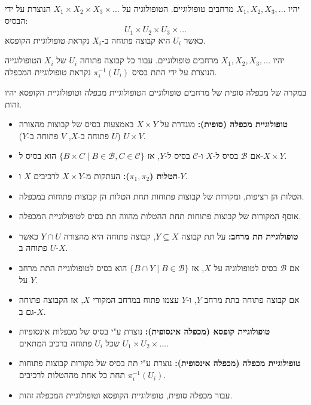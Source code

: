 \documentclass{tstextbook}
\begin{document}
\begin{definition}
יהיו \(X_{1},X_{2},X_{3},\dots\) מרחבים טופולוגיים. הטופולוגיה על \(X_{1}\times X_{2}\times X_{3}\times\dots\) הנוצרת על ידי הבסיס:
$$U_{1}\times U_{2}\times U_{3}\times\dots$$
כאשר \(U_{i}\) היא קבוצה פתוחה ב-\(X_{i}\) נקראת טופולוגיית הקופסא.

\end{definition}
\begin{definition}
יהיו \(X_{1},X_{2},X_{3},\dots\) מרחבים טופולוגיים. עבור כל קבוצה פתוחה \(U_{i}\) של \(X_{i}\) הטופולוגייה הנוצרת על ידי התת בסיס \(\pi_{i}^{-1}(U_{i})\) נקראת טופולוגיית המכפלה.

\end{definition}
\begin{remark}
במקרה של מכפלה סופית של מרחבים טופולוגיים הטופולוגיית מכפלה וטופולוגיית הקופסא יהיו זהות.

\end{remark}
\begin{summary}
  \begin{itemize}
    \item \textbf{טופולוגיית מכפלה (סופית):} מוגדרת על \(X \times Y\) באמצעות בסיס של קבוצות מהצורה \(U \times V\) (\(U\) פתוחה ב-\(X\), \(V\) פתוחה ב-\(Y\)).
    \item אם \(\mathcal{B}\) בסיס ל-\(X\) ו-\(\mathcal{C}\) בסיס ל-\(Y\), אז \(\{B \times C \mid B \in \mathcal{B}, C \in \mathcal{C}\}\) הוא בסיס ל-\(X \times Y\).
    \item \textbf{הטלות (\(\pi_1, \pi_2\)):} העתקות מ-\(X \times Y\) לרכיבים \(X\) ו-\(Y\).
    \item הטלות הן רציפות, ומקורות של קבוצות פתוחות תחת הטלות הן קבוצות פתוחות במכפלה.
    \item אוסף המקורות של קבוצות פתוחות תחת ההטלות מהווה תת בסיס לטופולוגיית המכפלה.
    \item \textbf{טופולוגיית תת מרחב:} על תת קבוצה \(Y \subseteq X\), קבוצה פתוחה היא מהצורה \(Y \cap U\) כאשר \(U\) פתוחה ב-\(X\).
    \item אם \(\mathcal{B}\) בסיס לטופולוגיה על \(X\), אז \(\{B \cap Y \mid B \in \mathcal{B}\}\) הוא בסיס לטופולוגיית התת מרחב על \(Y\).
    \item אם קבוצה פתוחה בתת מרחב \(Y\), ו-\(Y\) עצמו פתוח במרחב המקורי \(X\), אז הקבוצה פתוחה גם ב-\(X\).
    \item \textbf{טופולוגיית קופסא (מכפלה אינסופית):} נוצרת ע"י בסיס של מכפלות אינסופיות \(U_1 \times U_2 \times \dots\) שכל \(U_i\) פתוחה ברכיב המתאים.
    \item \textbf{טופולוגיית מכפלה (מכפלה אינסופית):} נוצרת ע"י תת בסיס של מקורות קבוצות פתוחות תחת כל אחת מההטלות לרכיבים \(\pi_i^{-1}(U_i)\).
    \item עבור מכפלה סופית, טופולוגיית הקופסא וטופולוגיית המכפלה זהות.
  \end{itemize}
\end{summary}
\end{document}
